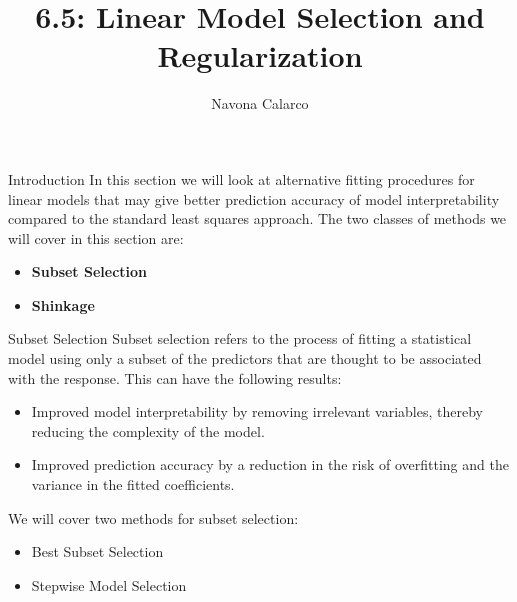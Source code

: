 \documentclass[
  ignorenonframetext,
  aspectratio=169,
]{beamer}
\title{6.5: Linear Model Selection and Regularization}
\author{Navona Calarco}
\date{}
\institute{The University of Toronto}
\begin{document}
\frame{\titlepage}
\ifdefined\Shaded\renewenvironment{Shaded}{\begin{tcolorbox}[breakable, frame hidden, boxrule=0pt, borderline west={3pt}{0pt}{shadecolor}, sharp corners, enhanced, interior hidden]}{\end{tcolorbox}}\fi

\begin{frame}{Introduction}
\protect\hypertarget{introduction}{}
In this section we will look at alternative fitting procedures for
linear models that may give better prediction accuracy of model
interpretability compared to the standard least squares approach. The
two classes of methods we will cover in this section are:

\begin{itemize}
\item
  \textbf{Subset Selection}
\item
  \textbf{Shinkage}
\end{itemize}
\end{frame}

\begin{frame}{Subset Selection}
\protect\hypertarget{subset-selection}{}
Subset selection refers to the process of fitting a statistical model
using only a subset of the predictors that are thought to be associated
with the response. This can have the following results:

\begin{itemize}
\item
  Improved \alert{model interpretability} by removing irrelevant
  variables, thereby reducing the complexity of the model.
\item
  Improved \alert{prediction accuracy} by a reduction in the risk of
  overfitting and the variance in the fitted coefficients.
\end{itemize}

We will cover two methods for subset selection:

\begin{itemize}
\item
  Best Subset Selection
\item
  Stepwise Model Selection
\end{itemize}
\end{frame}
\end{document}
